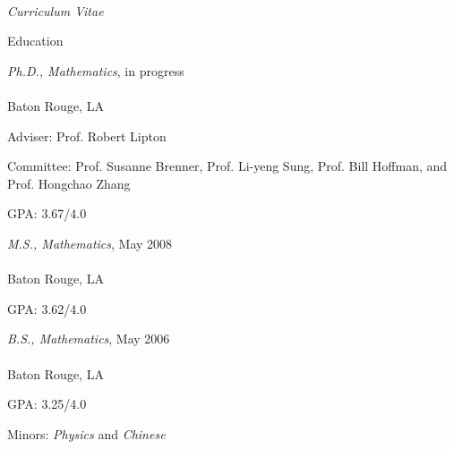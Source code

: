 \documentclass[10pt]{article}
\newenvironment{sublist}{%
	\begin{list}{}{%
		\setlength{\itemsep}{0em}\setlength{\parsep}{0em}%
		\setlength{\topsep}{0em}\setlength{\parskip}{0em}%
	}%
}%
{ \end{list} }
\begin{document}
\begin{cv}{\name\\{\large \itshape Curriculum Vitae}}
\begin{cvlist}{Education}
	\item \emph{Ph.D., Mathematics}, in progress\\
	\institute\\
	Baton Rouge, LA
	\begin{sublist}
		\item Adviser: Prof. Robert Lipton
		\item Committee: Prof. Susanne Brenner, Prof. Li-yeng Sung, Prof. Bill Hoffman, and Prof. Hongchao Zhang
		\item GPA: 3.67/4.0
	\end{sublist}
	\item \emph{M.S., Mathematics}, May 2008\\ 
	\institute\\
	Baton Rouge, LA
	\begin{sublist}
		\item GPA: 3.62/4.0
	\end{sublist}
	\item \emph{B.S., Mathematics}, May 2006\\
	\institute\\
	Baton Rouge, LA
	\begin{sublist}
		\item GPA: 3.25/4.0
		\item Minors: \emph{Physics} and \emph{Chinese}
	\end{sublist}
\end{cvlist}



\end{cv}
\end{document}
